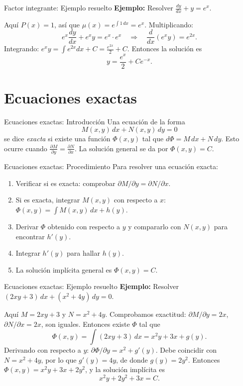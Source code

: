 \documentclass{beamer}
\begin{document}
\begin{frame}{Factor integrante: Ejemplo resuelto}
\textbf{Ejemplo:} Resolver $\displaystyle\frac{dy}{dx} + y = e^x$.

Aquí $P(x)=1$, así que $\mu(x) = e^{\int 1\,dx} = e^x$. Multiplicando:
\[
e^x \frac{dy}{dx} + e^x y = e^x \cdot e^x \quad\Longrightarrow\quad \frac{d}{dx}(e^x y) = e^{2x}.
\]
Integrando: $e^x y = \int e^{2x} dx + C = \frac{e^{2x}}{2} + C$. Entonces la solución es
\[
y = \frac{e^x}{2} + Ce^{-x}.
\]
\end{frame}

\section*{Ecuaciones exactas}
\begin{frame}{Ecuaciones exactas: Introducción}
Una ecuación de la forma
\[
M(x,y)\,dx + N(x,y)\,dy = 0
\]
se dice \emph{exacta} si existe una función $\Phi(x,y)$ tal que $d\Phi = M\,dx + N\,dy$. Esto ocurre cuando $\frac{\partial M}{\partial y} = \frac{\partial N}{\partial x}$. La solución general se da por $\Phi(x,y) = C$.
\end{frame}

\begin{frame}{Ecuaciones exactas: Procedimiento}
Para resolver una ecuación exacta:
\begin{enumerate}
  \item Verificar si es exacta: comprobar $\partial M/\partial y = \partial N/\partial x$.
  \item Si es exacta, integrar $M(x,y)$ con respecto a $x$: $\Phi(x,y) = \int M(x,y)\,dx + h(y)$.
  \item Derivar $\Phi$ obtenido con respecto a $y$ y compararlo con $N(x,y)$ para encontrar $h'(y)$.
  \item Integrar $h'(y)$ para hallar $h(y)$.
  \item La solución implícita general es $\Phi(x,y) = C$.
\end{enumerate}
\end{frame}

\begin{frame}{Ecuaciones exactas: Ejemplo resuelto}
\textbf{Ejemplo:} Resolver $(2xy + 3)\,dx + (x^2 + 4y)\,dy = 0$.

Aquí $M=2xy+3$ y $N=x^2+4y$. Comprobamos exactitud: $\partial M/\partial y = 2x$, $\partial N/\partial x = 2x$, son iguales. Entonces existe $\Phi$ tal que
\[
\Phi(x,y) = \int (2xy+3)\,dx = x^2y + 3x + g(y).
\]
Derivando con respecto a $y$: $\partial \Phi/\partial y = x^2 + g'(y)$. Debe coincidir con $N = x^2 + 4y$, por lo que $g'(y) = 4y$, de donde $g(y) = 2y^2$. Entonces $\Phi(x,y) = x^2y + 3x + 2y^2$, y la solución implícita es
\[
x^2 y + 2y^2 + 3x = C.
\]
\end{frame}
\end{document}
